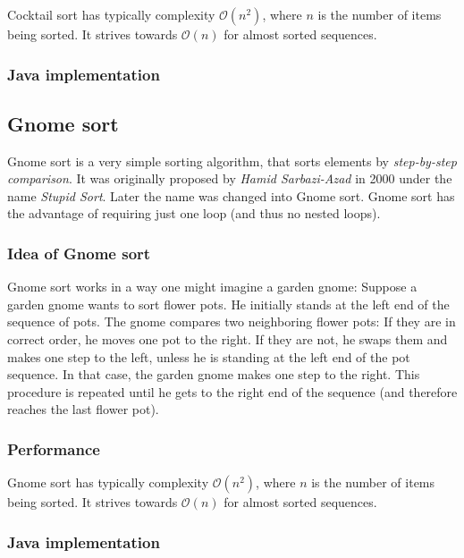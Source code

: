 \documentclass[]{pfBook}
\newcommand{\OO}{\mathcal{O}}
\begin{document}
	Cocktail sort has typically complexity $\OO(n^2)$, where $n$ is the number of items being sorted. It strives towards $\OO(n)$ for almost sorted sequences.
	
	\subsubsection{Java implementation}
	
	
	
	\subsection{Gnome sort}
	
	Gnome sort is a very simple sorting algorithm, that sorts elements by \emph{step-by-step comparison}. It was originally proposed by \emph{Hamid Sarbazi-Azad} in 2000 under the name \emph{Stupid Sort}. Later the name was changed into Gnome sort. Gnome sort has the advantage of requiring just one loop (and thus no nested loops).
	
	\subsubsection{Idea of Gnome sort}
	
	Gnome sort works in a way one might imagine a garden gnome: Suppose a garden gnome wants to sort flower pots. He initially stands at the left end of the sequence of pots. The gnome compares two neighboring flower pots: If they are in correct order, he moves one pot to the right. If they are not, he swaps them and makes one step to the left, unless he is standing at the left end of the pot sequence. In that case, the garden gnome makes one step to the right. This procedure is repeated until he gets to the right end of the sequence (and therefore reaches the last flower pot).
	
	\subsubsection{Performance}
	
	Gnome sort has typically complexity $\OO(n^2)$, where $n$ is the number of items being sorted. It strives towards $\OO(n)$ for almost sorted sequences.
	
	\subsubsection{Java implementation}
	
\end{document}
